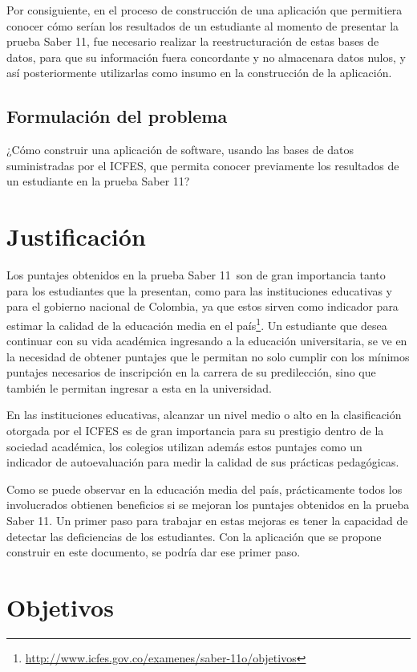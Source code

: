 Por consiguiente, en el proceso de construcción de una aplicación que permitiera conocer cómo serían los resultados de un estudiante al momento de presentar la prueba Saber 11\degree, fue necesario realizar la reestructuración de estas bases de datos, para que su información fuera concordante y no almacenara datos nulos, y así posteriormente utilizarlas como insumo en la construcción de la aplicación.
\subsection{Formulación del problema}
¿Cómo construir una aplicación de software, usando las bases de datos suministradas por el ICFES, que permita conocer previamente los resultados de un estudiante en la prueba Saber 11\degree?
\section{Justificación}
Los puntajes obtenidos en la prueba Saber 11\degree \ son de gran importancia tanto para los estudiantes que la presentan, como para las instituciones educativas y para el gobierno nacional de Colombia, ya que estos sirven como indicador para estimar la calidad de la educación media en el país\footnote{\url{http://www.icfes.gov.co/examenes/saber-11o/objetivos}}.
Un estudiante que desea continuar con su vida académica ingresando a la educación universitaria, se ve en la necesidad de obtener puntajes que le permitan no solo cumplir con los mínimos puntajes necesarios de inscripción en la carrera de su predilección, sino que también le permitan ingresar a esta en la universidad. 

En las instituciones educativas, alcanzar un nivel medio o alto en la clasificación otorgada por el ICFES es de gran importancia para su prestigio dentro de la sociedad académica, los colegios utilizan además estos puntajes como un indicador de autoevaluación para medir la calidad de sus prácticas pedagógicas. 

Como se puede observar en la educación media del país, prácticamente todos los involucrados obtienen beneficios si se mejoran los puntajes obtenidos en la prueba Saber 11\degree. Un primer paso para trabajar en estas mejoras es tener la capacidad de detectar las deficiencias de los estudiantes. Con la aplicación que se propone construir en este documento, se podría dar ese primer paso. 
\section{Objetivos}
